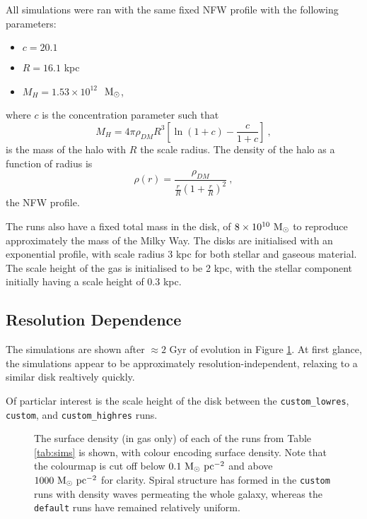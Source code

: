 All simulations were ran with the same fixed NFW profile with the following parameters:
\begin{itemize}
    \item $c = 20.1$
    \item $R = 16.1$ kpc
    \item $M_{H} = 1.53 \times 10^{12}$ $~\mathrm{M}_{\odot}$,
\end{itemize}
where $c$ is the concentration parameter such that
$$
    M_{H} = 4\pi \rho_{DM} R^3 \left[ \ln (1 + c) - \frac{c}{1+c} \right]~,
$$
is the mass of the halo with $R$ the scale radius.
The density of the halo as a function of radius is 
\begin{equation}
    \rho(r) = \frac{\rho_{DM}}{\frac{r}{R} \left( 1 + \frac{r}{R} \right)^2}~,
    \label{eqn:nfw}
\end{equation}
the NFW profile.

The runs also have a fixed total mass in the disk, of $8\times10^{10} ~\mathrm{M}_{\odot}$ to reproduce approximately the mass of the Milky Way.
The disks are initialised with an exponential profile, with scale radius $3$ kpc for both stellar and gaseous material.
The scale height of the gas is initialised to be 2 kpc, with the stellar component initially having a scale height of 0.3 kpc.

\subsection{Resolution Dependence}

The simulations are shown after $\approx 2$ Gyr of evolution in Figure \ref{fig:sdbig}. At first glance, the simulations appear to be approximately resolution-independent, relaxing to a similar disk realtively quickly.

Of particlar interest is the scale height of the disk between the {\tt custom\_lowres}, {\tt custom}, and {\tt custom\_highres} runs.


\begin{figure}[!ht]
    \leavevmode\rlap{\usebox{\graphicsbox}}%
    \begin{minipage}[b]{0.63\wd\graphicsbox}%
        \caption{The surface density (in gas only) of each of the runs from Table \ref{tab:sims} is shown, with colour encoding surface density. Note that the colourmap is cut off below $0.1 ~\mathrm{M}_{\odot} ~\mathrm{pc}^{-2}$ and above $1000 ~\mathrm{M}_{\odot} ~\mathrm{pc}^{-2}$ for clarity. Spiral structure has formed in the {\tt custom} runs with density waves permeating the whole galaxy, whereas the {\tt default} runs have remained relatively uniform.}
        \label{fig:sdbig}
    \end{minipage}\hspace*{0.33\wd\graphicsbox}%
\end{figure}


